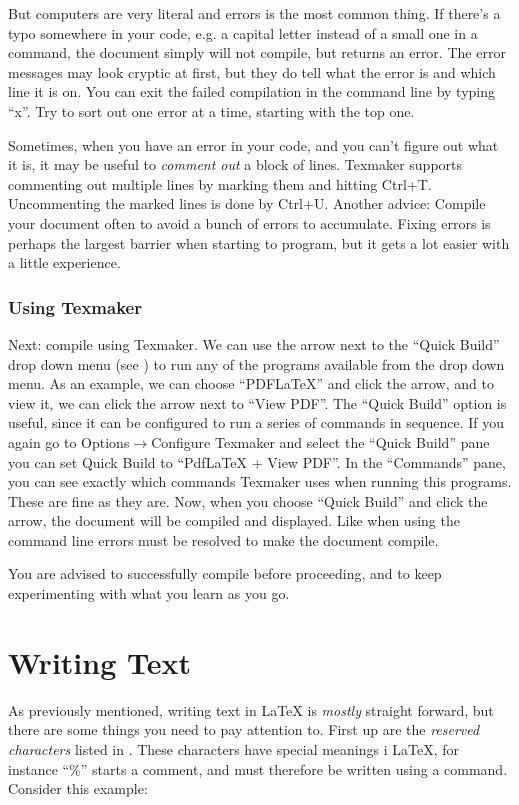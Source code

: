 But computers are very literal and errors is the most common thing. If there's a typo somewhere in your code, e.g. a capital letter instead of a small one in a command, the document simply will not compile, but returns an error. The error messages may look cryptic at first, but they do tell what the error is and which line it is on. You can exit the failed compilation in the command line by typing ``x''. Try to sort out one error at a time, starting with the top one.

Sometimes, when you have an error in your code, and you can't figure out what it is, it may be useful to \emph{comment out} a block of lines. Texmaker supports commenting out multiple lines by marking them and hitting Ctrl+T. Uncommenting the marked lines is done by Ctrl+U. Another advice: Compile your document often to avoid a bunch of errors to accumulate. Fixing errors is perhaps the largest barrier when starting to program, but it gets a lot easier with a little experience.

\subsubsection{Using Texmaker}
Next: compile using Texmaker. We can use the arrow next to the ``Quick Build'' drop down menu (see ) to run any of the programs available from the drop down menu. As an example, we can choose ``PDFLaTeX'' and click the arrow, and to view it, we can click the arrow next to ``View PDF''. The ``Quick Build'' option is useful, since it can be configured to run a series of commands in sequence. If you again go to Options$\rightarrow$Configure Texmaker and select the ``Quick Build'' pane you can set Quick Build to ``PdfLaTeX + View PDF''. In the ``Commands'' pane, you can see exactly which commands Texmaker uses when running this programs. These are fine as they are. Now, when you choose ``Quick Build'' and click the arrow, the document will be compiled and displayed. Like when using the command line errors must be resolved to make the document compile.

You are advised to successfully compile  before proceeding, and to keep experimenting with what you learn as you go.

\section{Writing Text}
As previously mentioned, writing text in \LaTeX{} is \emph{mostly} straight forward, but there are some things you need to pay attention to. First up are the \emph{reserved characters} listed in . These characters have special meanings i \LaTeX{}, for instance ``\%'' starts a comment, and must therefore be written using a command. Consider this example:

